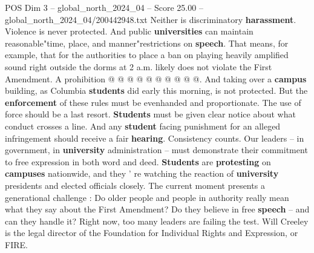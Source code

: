 \begin{textsample}{POS Dim 3 – global\_north\_2024\_04 – Score 25.00 – global\_north\_2024\_04/200442948.txt}
Neither is discriminatory \textbf{harassment}.
Violence is never protected.
And public \textbf{universities} can maintain reasonable"time, place, and manner"restrictions on \textbf{speech}.
That means, for example, that for the authorities to place a ban on playing heavily amplified sound right outside the dorms at 2 a.m. likely does not violate the First Amendment.
A prohibition @ @ @ @ @ @ @ @ @ @.
And taking over a \textbf{campus} building, as Columbia \textbf{students} did early this morning, is not protected.
But the \textbf{enforcement} of these rules must be evenhanded and proportionate.
The use of force should be a last resort. \textbf{Students} must be given clear notice about what conduct crosses a line.
And any \textbf{student} facing punishment for an alleged infringement should receive a fair \textbf{hearing}.
Consistency counts.
Our leaders -- in government, in \textbf{university} administration -- must demonstrate their commitment to free expression in both word and deed. \textbf{Students} are \textbf{protesting} on \textbf{campuses} nationwide, and they ' re watching the reaction of \textbf{university} presidents and elected officials closely.
The current moment presents a generational challenge : Do older people and people in authority really mean what they say about the First Amendment?
Do they believe in free \textbf{speech} -- and can they handle it?
Right now, too many leaders are failing the test.
Will Creeley is the legal director of the Foundation for Individual Rights and Expression, or FIRE.

\end{textsample}
